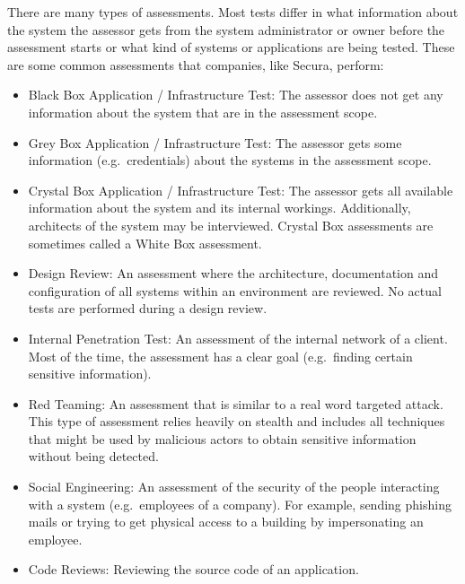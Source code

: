 There are many types of assessments. Most tests differ in what information about the system the assessor gets from the system administrator or owner before the assessment starts or what kind of systems or applications are being tested. These are some common assessments that companies, like Secura, perform:
\begin{itemize}
    \item Black Box Application / Infrastructure Test: The assessor does not get any information about the system that are in the assessment scope.
    
    \item Grey Box Application / Infrastructure Test: The assessor gets some information (e.g.\ credentials) about the systems in the assessment scope.
    
    \item Crystal Box Application / Infrastructure Test:  The assessor gets all available information about the system and its internal workings. Additionally, architects of the system may be interviewed. Crystal Box assessments are sometimes called a White Box assessment.
    
    \item Design Review: An assessment where the architecture, documentation and configuration of all systems within an environment are reviewed. No actual tests are performed during a design review.   
    \item Internal Penetration Test: An assessment of the internal network of a client. Most of the time, the assessment has a clear goal (e.g.\ finding certain sensitive information).
    
    \item Red Teaming: An assessment that is similar to a real word targeted attack. This type of assessment relies heavily on stealth and includes all techniques that might be used by malicious actors to obtain sensitive information without being detected.
    
    \item Social Engineering: An assessment of the security of the people interacting with a system (e.g.\ employees of a company). For example, sending phishing mails or trying to get physical access to a building by impersonating an employee.
    
    \item Code Reviews: Reviewing the source code of an application.
\end{itemize}

